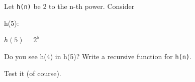 Let \texttt{h(n)} be 2 to the n-th power. Consider

h(5):



$h(5) = 2^5$



Do you see h(4) in h(5)? Write a recursive function for \texttt{h(n)}.

Test it (of course).

